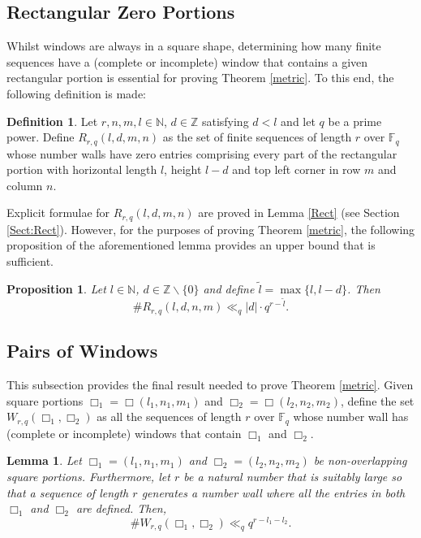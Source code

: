 \documentclass{article}
\newtheorem{lemma}[theorem]{Lemma}
\newtheorem{prop}[theorem]{Proposition}
\theoremstyle{definition}
\newtheorem{definition}[theorem]{Definition}
\newcommand{\N}{\mathbb{N}}
\newcommand{\F}{\mathbb{F}}
\newcommand{\Z}{\mathbb{Z}}
\numberwithin{equation}{subsection}
\begin{document}
\subsection{Rectangular Zero Portions}

\noindent Whilst windows are always in a square shape, determining how many finite sequences have a (complete or incomplete) window that contains a given rectangular portion is essential for proving Theorem \ref{metric}. To this end, the following definition is made:

\begin{definition}\label{Rect_prtn}
Let $r,n,m,l\in\N$, $d\in\Z$ satisfying $d<l$ and let $q$ be a prime power. Define $R_{r,q}(l,d,m,n)$ as the set of finite sequences of length $r$ over $\F_q$ whose number walls have zero entries comprising every part of the rectangular portion with horizontal length $l$, height $l-d$ and top left corner in row $m$ and column $n$.
\end{definition}
\noindent Explicit formulae for $R_{r,q}(l,d,m,n)$ are proved in Lemma \ref{Rect} (see Section \ref{Sect:Rect}). However, for the purposes of proving Theorem \ref{metric}, the following proposition of the aforementioned lemma provides an upper bound that is sufficient. 
\begin{prop}\label{bound}
    Let $l\in\N$, $d\in\Z\backslash\{0\}$ and define $\widetilde{l}=\max\{l,l-d\}$. Then \[\#R_{r,q}({l,d,n,m})\ll_q |d|\cdot q^{r-\widetilde l}.\] 
\end{prop}

\subsection{Pairs of Windows}\label{Sect: Pair of Wind}
\noindent This subsection provides the final result needed to prove Theorem \ref{metric}. Given square portions $\Box_1=\Box(l_1,n_1,m_1)$ and $\Box_2=\Box(l_2,n_2,m_2)$, define the set $W_{r,q}({\Box_1,\Box_2})$ as all the sequences of length $r$ over $\F_q$ whose number wall has (complete or incomplete) windows that contain $\Box_1$ and $\Box_2$. 
\begin{lemma}
   Let $\Box_1=(l_1,n_1,m_1)$ and $\Box_2=(l_2,n_2,m_2)$ be non-overlapping square portions. Furthermore, let $r$ be a natural number that is suitably large so that a sequence of length $r$ generates a number wall where all the entries in both $\Box_1$ and $\Box_2$ are defined. Then, \begin{equation}\#W_{r,q}(\Box_1,\Box_2)\ll_q q^{r-l_1-l_2}.\label{twowindbound}\end{equation} \label{twowind}
\end{lemma}
\end{document}
